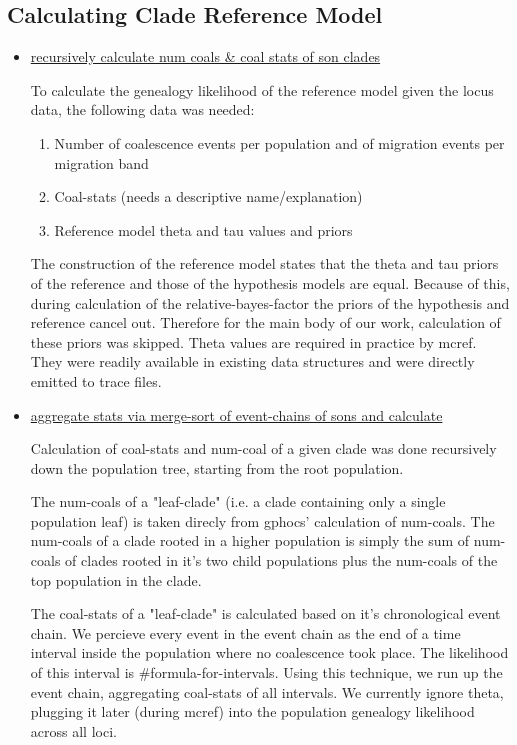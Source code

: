 \documentclass[11pt]{article}
\begin{document}
\subsection{Calculating Clade Reference Model}
\begin{itemize}

\item \underline{recursively calculate num coals \& coal stats of son clades}

To calculate the genealogy likelihood of the reference model given the locus data, the following data was needed:
\begin{enumerate}
\item Number of coalescence events per population and of migration events per migration band
\item Coal-stats (needs a descriptive name/explanation)
\item Reference model theta and tau values and priors
\end{enumerate}


The construction of the reference model states that the theta and tau priors of the reference and those of the hypothesis models are
equal. Because of this, during calculation of the relative-bayes-factor the priors of the hypothesis and reference cancel out. Therefore for the main body of our work, calculation of these priors was skipped. Theta values are required in practice by mcref. They were readily available in existing data structures and were directly emitted to trace files.


\item \underline{aggregate stats via merge-sort of event-chains of sons and calculate}

Calculation of coal-stats and num-coal of a given clade was done recursively down the population tree, starting from the root population. 

The num-coals of a "leaf-clade" (i.e. a clade containing only a single population leaf) is taken direcly from gphocs' calculation of num-coals. The num-coals of a clade rooted in a higher population is simply the sum of num-coals of clades rooted in it's two child populations plus the num-coals of the top population in the clade.

The coal-stats of a "leaf-clade" is calculated based on it's chronological event chain. We percieve every event in the event chain as the end of a time interval inside the population where no coalescence took place. The likelihood of this interval is \#formula-for-intervals. Using this technique, we run up the event chain, aggregating coal-stats of all intervals. We currently ignore theta, plugging it later (during mcref) into the population genealogy likelihood across all loci. 


\end{itemize}
\end{document}
